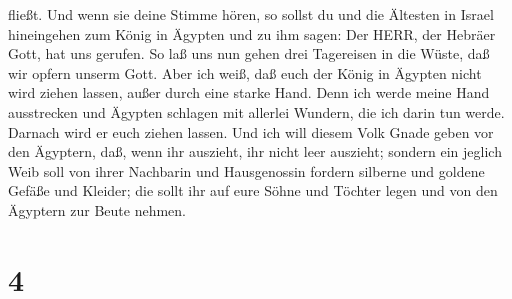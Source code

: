 fließt.  Und wenn sie deine Stimme hören, so sollst du und
die Ältesten in Israel hineingehen zum König in Ägypten und zu ihm
sagen: Der HERR, der Hebräer Gott, hat uns gerufen. So laß uns nun gehen
drei Tagereisen in die Wüste, daß wir opfern unserm Gott. 
Aber ich weiß, daß euch der König in Ägypten nicht wird ziehen lassen,
außer durch eine starke Hand.  Denn ich werde meine Hand
ausstrecken und Ägypten schlagen mit allerlei Wundern, die ich darin tun
werde. Darnach wird er euch ziehen lassen.  Und ich will
diesem Volk Gnade geben vor den Ägyptern, daß, wenn ihr auszieht, ihr
nicht leer auszieht;  sondern ein jeglich Weib soll von
ihrer Nachbarin und Hausgenossin fordern silberne und goldene Gefäße und
Kleider; die sollt ihr auf eure Söhne und Töchter legen und von den
Ägyptern zur Beute nehmen.

\hypertarget{section-3}{%
\section{4}\label{section-3}}

